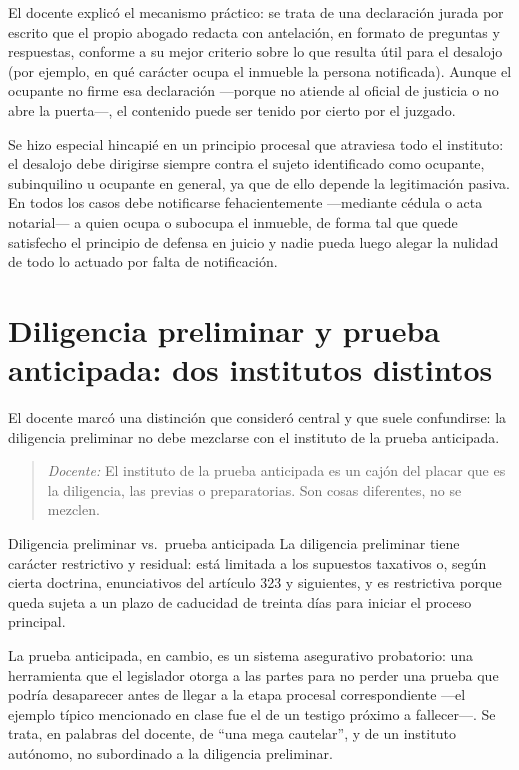 \documentclass[12pt,oneside]{book}
\begin{document}
El docente explicó el mecanismo práctico: se trata de una declaración jurada por escrito que el propio abogado redacta con antelación, en formato de preguntas y respuestas, conforme a su mejor criterio sobre lo que resulta útil para el desalojo (por ejemplo, en qué carácter ocupa el inmueble la persona notificada). Aunque el ocupante no firme esa declaración —porque no atiende al oficial de justicia o no abre la puerta—, el contenido puede ser tenido por cierto por el juzgado.

Se hizo especial hincapié en un principio procesal que atraviesa todo el instituto: el desalojo debe dirigirse siempre contra el sujeto identificado como ocupante, subinquilino u ocupante en general, ya que de ello depende la legitimación pasiva. En todos los casos debe notificarse fehacientemente —mediante cédula o acta notarial— a quien ocupa o subocupa el inmueble, de forma tal que quede satisfecho el principio de defensa en juicio y nadie pueda luego alegar la nulidad de todo lo actuado por falta de notificación.

\section{Diligencia preliminar y prueba anticipada: dos institutos distintos}

El docente marcó una distinción que consideró central y que suele confundirse: la diligencia preliminar no debe mezclarse con el instituto de la prueba anticipada.

\begin{quote}
\textit{Docente:} El instituto de la prueba anticipada es un cajón del placar que es la diligencia, las previas o preparatorias. Son cosas diferentes, no se mezclen.
\end{quote}

\begin{definition}{Diligencia preliminar vs.\ prueba anticipada}
La diligencia preliminar tiene carácter restrictivo y residual: está limitada a los supuestos taxativos o, según cierta doctrina, enunciativos del artículo 323 y siguientes, y es restrictiva porque queda sujeta a un plazo de caducidad de treinta días para iniciar el proceso principal.

La prueba anticipada, en cambio, es un sistema asegurativo probatorio: una herramienta que el legislador otorga a las partes para no perder una prueba que podría desaparecer antes de llegar a la etapa procesal correspondiente —el ejemplo típico mencionado en clase fue el de un testigo próximo a fallecer—. Se trata, en palabras del docente, de ``una mega cautelar'', y de un instituto autónomo, no subordinado a la diligencia preliminar.
\end{definition}
\end{document}
